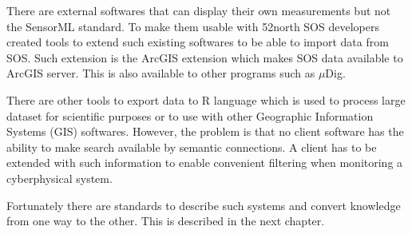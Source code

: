 There are external softwares that can display their own measurements but not the SensorML standard. To make them usable with 52north SOS developers created tools to extend such existing softwares to be able to import data from SOS.
Such extension is the ArcGIS extension which makes SOS data available to ArcGIS server. This is also available to other programs such as $\mu$Dig. 

There are other tools to export data to R language which is used to process large dataset for scientific purposes or to use with other Geographic Information Systems (GIS) softwares. However, the problem is that no client software has the ability to make search available by semantic connections. A client has to be extended with such information to enable convenient filtering when monitoring a cyberphysical system.

Fortunately there are standards to describe such systems and convert knowledge from one way to the other. This is described in the next chapter.
